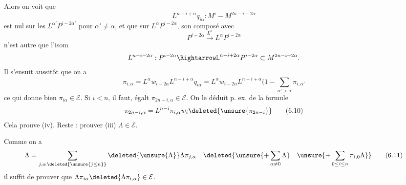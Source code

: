 Alors on voit que
\[
L^{n-i+\alpha}q_{i\alpha}:M^i-M^{2n-i+2\alpha}
\]
est nul sur les $L^{\alpha'}P^{i-2\alpha'}$ pour $\alpha'\neq\alpha$, et que sur $L^\alpha P^{i-2\alpha}$,  son composé avec
\[
P^{i-2\alpha}\xrightarrow{L^\alpha}L^\alpha P^{i-2\alpha}
\]
n'est autre que l'isom
\[
L^{n-i-2\alpha}:P^{i-2\alpha}\RightarrowL^{n-i+2\alpha}P^{i-2\alpha}\subset M^{2n-i+2\alpha}.
\]
Il s'ensuit aussitôt que on a
\[
\pi_{i,\alpha}=L^\alpha w_{i-2\alpha}L^{n-i+\alpha}q_{i\alpha}=L^\alpha w_{i-2\alpha}L^{n-i+\alpha}(1-\sum_{\alpha'>\alpha}\pi_{i,\alpha'}
\tag{6.9}
\]
ce qui donne bien $\pi_{i\alpha}\in\mathcal E$. 
Si $i<n$, il faut, égalt $\pi_{2n-i,\alpha}\in\mathcal E$. On
le déduit p. ex. de la formule
\[
\pi_{2n-i,\alpha}=L^{n-i}\pi_{i,\alpha}w_i\deleted{\unsure{\pi_{2n-i}}}
\tag{6.10}
\]
Cela prouve  (iv). Reste : prouver (iii) $\Lambda\in\mathcal E$.

Comme on a
\[
\Lambda=\sum_{j,\alpha\,\deleted{\unsure{j\leq n}}}\deleted{\unsure{\Lambda}}\Lambda\pi_{j,\alpha}\quad\deleted{\unsure{+\sum_{\alpha\neq0}\Lambda}\quad\unsure{+\sum_{0\leq i\leq n}\pi_{i,0}\Lambda}}
\tag{6.11}
\]
il suffit de prouver que $\Lambda\pi_{i\alpha}\deleted{\Lambda\pi_{i,\alpha}}\in\mathcal E$.
